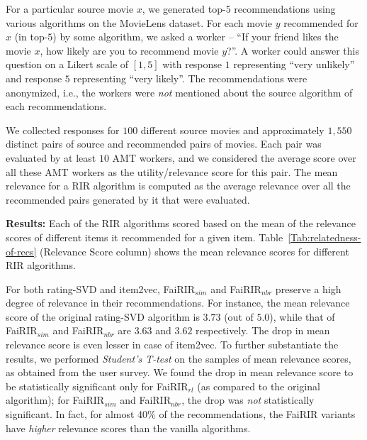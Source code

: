 For a particular source movie $x$, we generated top-$5$ recommendations using various algorithms on the MovieLens dataset.
For each movie $y$ recommended for $x$ (in top-$5$) by some algorithm, we asked a worker -- ``If your friend likes the movie $x$, how likely are you to recommend movie $y$?''. 
A worker could answer this question on a Likert scale of $[1,5]$ with response $1$ representing ``very unlikely'' and response $5$ representing ``very likely''.
The recommendations were anonymized, i.e., the workers were {\it not} mentioned 
about the source algorithm of each recommendations.


We collected responses for $100$ different source movies and approximately $1,550$ distinct pairs of source and recommended pairs of movies. Each pair was evaluated by at least $10$ AMT workers, and we considered the average score over all these AMT workers as the utility/relevance score for this pair. 
The mean relevance for a RIR algorithm is computed as the average relevance over all the recommended pairs generated by it that were evaluated.



\noindent
\textbf{Results:} 
Each of the RIR algorithms scored based on the mean of the relevance scores of different items it recommended %
for a given item. 
Table~\ref{Tab:relatedness-of-recs} (Relevance Score column) shows the mean relevance scores for different RIR algorithms.

For both rating-SVD and item2vec, FaiRIR$_{sim}$ and FaiRIR$_{nbr}$ preserve a high degree of relevance in their recommendations. For instance, the mean relevance score of the original rating-SVD algorithm is $3.73$ (out of $5.0$), while that of FaiRIR$_{sim}$ and FaiRIR$_{nbr}$ are $3.63$ and $3.62$ respectively. The drop in mean relevance score is even lesser in case of item2vec.
To further substantiate the results, we 
performed {\it Student's T-test} on the samples of mean relevance scores, as obtained from the user survey. 
We found the drop in mean relevance score to be statistically significant only for FaiRIR$_{rl}$ (as compared to the original algorithm); for FaiRIR$_{sim}$ and FaiRIR$_{nbr}$, the drop 
was {\it not} statistically significant. 
In fact, for almost 40\% of the recommendations, the %
FaiRIR variants have {\it higher} relevance scores than the vanilla algorithms. 








